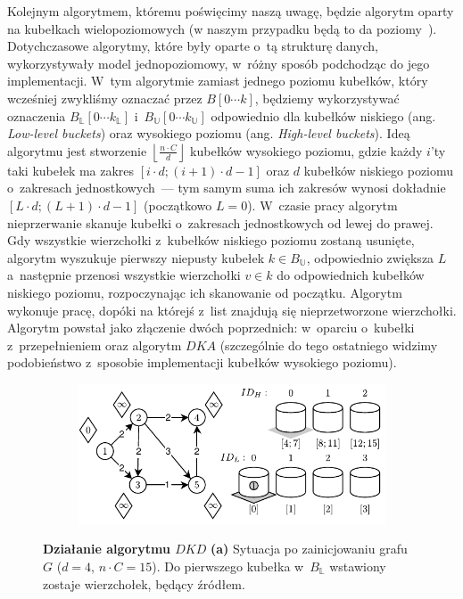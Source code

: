 Kolejnym algorytmem, któremu poświęcimy naszą uwagę, będzie algorytm oparty na kubełkach wielopoziomowych (w naszym przypadku będą to da poziomy~\cite[$4.2$]{NetOpt}). Dotychczasowe algorytmy, które były oparte o~tą strukturę danych, wykorzystywały model jednopoziomowy, w~różny sposób podchodząc do jego implementacji. W~tym algorytmie zamiast jednego poziomu kubełków, który wcześniej zwykliśmy oznaczać przez $B \left[ 0 \cdots k \right]$, będziemy wykorzystywać oznaczenia $B_{\mathbb{L}} \left[ 0 \cdots k_{\mathbb{L}} \right]$ i~$B_{\mathbb{U}} \left[ 0 \cdots k_{\mathbb{U}} \right]$ odpowiednio dla kubełków niskiego (ang. \textit{Low-level buckets}) oraz wysokiego poziomu (ang. \textit{High-level buckets}). Ideą algorytmu jest stworzenie $ \left \lfloor \frac{n \cdot C}{d} \right \rfloor $ kubełków wysokiego poziomu, gdzie każdy $i$'ty taki kubełek ma zakres $ \left[ i \cdot d ; \left( i+1 \right) \cdot d - 1\right]$ oraz $d$ kubełków niskiego poziomu o~zakresach jednostkowych~--- tym samym suma ich zakresów wynosi dokładnie $ \left[ L \cdot d ; \left( L+1 \right) \cdot d - 1\right]$ (początkowo $L=0$). W~czasie pracy algorytm nieprzerwanie skanuje kubełki o~zakresach jednostkowych od lewej do prawej. Gdy wszystkie wierzchołki z~kubełków niskiego poziomu zostaną usunięte, algorytm wyszukuje pierwszy niepusty kubełek $k \in B_{\mathbb{U}}$, odpowiednio zwiększa $L$ a~następnie przenosi wszystkie wierzchołki $v \in k$ do odpowiednich kubełków niskiego poziomu, rozpoczynając ich skanowanie od początku. Algorytm wykonuje pracę, dopóki na którejś z~list znajdują się nieprzetworzone wierzchołki. Algorytm powstał jako złączenie dwóch poprzednich: w~oparciu o~kubełki z~przepełnieniem oraz algorytm $DKA$ (szczególnie do tego ostatniego widzimy podobieństwo z~sposobie implementacji kubełków wysokiego poziomu).

\begin{figure}[!htbp]
	\centering
	\begin{subfigure}[b]{0.45\textwidth}
		\includegraphics[width=\textwidth]{Chapter_II/DOUBLE-LEVEL-BUCKET-Example/a.pdf}
		\caption{}
	\end{subfigure}%
	\caption{\textbf{Działanie algorytmu $DKD$} \textbf{(a)} Sytuacja po zainicjowaniu grafu $G$ ($d=4$, $n \cdot C = 15$). Do pierwszego kubełka w~$B_{\mathbb{L}}$ wstawiony zostaje wierzchołek, będący źródłem. } \label{fig:exampleDoubleLevelBuckets1}
\end{figure}
	
